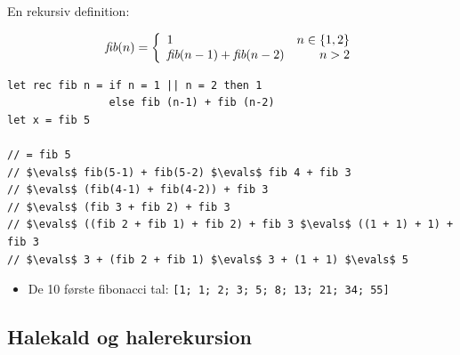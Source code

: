 \documentclass[rgb]{beamer}
\begin{document}
\begin{frame}[fragile]
\begin{footnotesize}


  En rekursiv definition:

  $$ \mbox{\it{fib}}(n) = \left \{ \begin{array}{lr} 1 & n \in \{1,2\} \\ \mbox{\it{fib}}(n-1) + \mbox{\it{fib}}(n-2) & n > 2\end{array} \right . $$


\begin{lstlisting}[numbers=none,frame=none,mathescape]
let rec fib n = if n = 1 || n = 2 then 1
                else fib (n-1) + fib (n-2)
let x = fib 5

// = fib 5
// $\evals$ fib(5-1) + fib(5-2) $\evals$ fib 4 + fib 3
// $\evals$ (fib(4-1) + fib(4-2)) + fib 3
// $\evals$ (fib 3 + fib 2) + fib 3
// $\evals$ ((fib 2 + fib 1) + fib 2) + fib 3 $\evals$ ((1 + 1) + 1) + fib 3
// $\evals$ 3 + (fib 2 + fib 1) $\evals$ 3 + (1 + 1) $\evals$ 5
\end{lstlisting}

\begin{itemize}
\item De 10 første fibonacci tal: \lstinline{[1; 1; 2; 3; 5; 8; 13; 21; 34; 55]}
\end{itemize}
\end{footnotesize}
\end{frame}







\subsection{Halekald og halerekursion}
\end{document}
